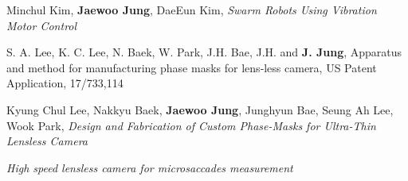 \documentclass[a4paper,12pt]{memoir} %
\begin{document}
{Minchul Kim, \textbf{Jaewoo Jung}, DaeEun Kim, \textit{Swarm Robots Using Vibration Motor Control}}


\Sep %



{S. A. Lee, K. C. Lee, N. Baek, W. Park, J.H. Bae, J.H. and \textbf{J. Jung}, Apparatus and method for manufacturing phase masks for lens‐less camera, US Patent Application, 17/733,114}


\Sep




{Kyung Chul Lee, Nakkyu Baek, \textbf{Jaewoo Jung}, Junghyun Bae, Seung Ah Lee, Wook Park, \textit{Design and Fabrication of Custom Phase-Masks for Ultra-Thin Lensless Camera}}


\clearpage %

\userinformation %

\framebreak %

\Sep



{\textit{High speed lensless camera for microsaccades measurement}}

\end{document}
